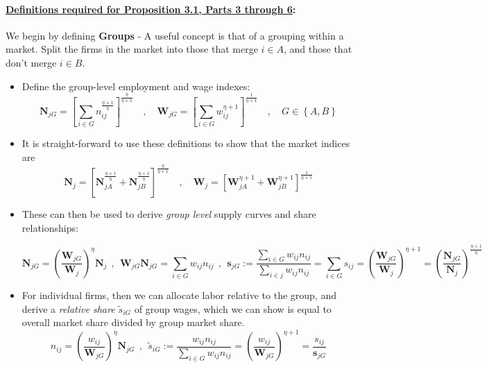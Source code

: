 \documentclass[12pt]{article}
\theoremstyle{prop}
\begin{document}
\paragraph{\underline{Definitions required for Proposition 3.1, Parts 3 through 6}: }
We begin by defining \textbf{Groups }- A useful concept is that of a grouping within a
market. Split the firms in the market into those that merge $i\in A$,
and those that don't merge $i\in B$.
\begin{itemize}
	\item Define the group-level employment and wage indexes:
	\[
	\mathbf{N}_{jG}=\left[\sum_{i\in G}n_{ij}^{\frac{\eta+1}{\eta}}\right]^{\frac{\eta}{\eta+1}}\quad,\quad\mathbf{W}_{jG}=\left[\sum_{i\in G}w_{ij}^{\eta+1}\right]^{\frac{1}{\eta+1}}\quad,\quad G\in\left\{ A,B\right\}
	\]
	\item It is straight-forward to use these definitions to show that the market
	indices are
	\[
	\mathbf{N}_{j}=\left[\mathbf{N}_{jA}^{\frac{\eta+1}{\eta}}+\mathbf{N}_{jB}^{\frac{\eta+1}{\eta}}\right]^{\frac{\eta}{\eta+1}}\quad,\quad\mathbf{W}_{j}=\left[\mathbf{W}_{jA}^{\eta+1}+\mathbf{W}_{jB}^{\eta+1}\right]^{\frac{1}{\eta+1}}
	\]
	\item These can then be used to derive \emph{group level }supply curves
	and share relationships:
 \begin{small}
	\[
	\mathbf{N}_{jG}=\left(\frac{\mathbf{W}_{jG}}{\mathbf{W}_{j}}\right)^{\eta}\mathbf{N}_{j}\:\:,\:\:\mathbf{W}_{jG}\mathbf{N}_{jG}=\sum_{i\in G}w_{ij}n_{ij}\:\:,\:\:\boldsymbol{s}_{jG}:=\frac{\sum_{i\in G}w_{ij}n_{ij}}{\sum_{i\in j}w_{ij}n_{ij}}=\sum_{i\in G}s_{ij}=\left(\frac{\mathbf{W}_{jG}}{\mathbf{W}_{j}}\right)^{\eta+1}=\left(\frac{\mathbf{N}_{jG}}{\mathbf{N}_{j}}\right)^{\frac{\eta+1}{\eta}}
	\]
 \end{small}
	\item For individual firms, then we can allocate labor relative to the group,
	and derive a \emph{relative share $\widetilde{s}_{iG}$ }of group
	wages, which we can show is equal to overall market share divided
	by group market share.
	\[
	n_{ij}=\left(\frac{w_{ij}}{\mathbf{W}_{jG}}\right)^{\eta}\mathbf{N}_{jG}\:\:,\:\:\widetilde{s}_{iG}:=\frac{w_{ij}n_{ij}}{\sum_{i\in G}w_{ij}n_{ij}}=\left(\frac{w_{ij}}{\mathbf{W}_{jG}}\right)^{\eta+1}=\frac{s_{ij}}{\boldsymbol{s}_{jG}}
	\]
\end{itemize}
 

\bigskip
\end{document}
